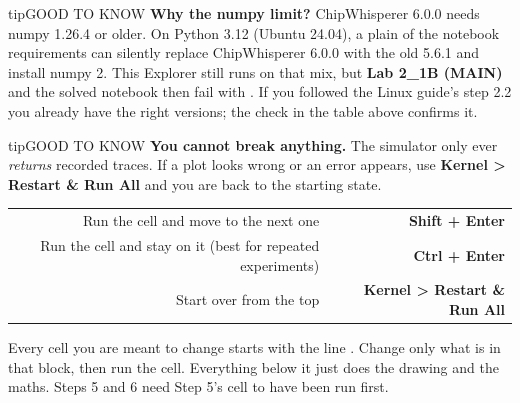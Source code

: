 \documentclass[11pt,letterpaper]{article}
\begin{document}
\begin{guidecallout}{tip}{GOOD TO KNOW}
\textbf{Why the numpy limit?} ChipWhisperer 6.0.0 needs numpy 1.26.4 or older. On Python 3.12 (Ubuntu 24.04), a plain
 of the notebook requirements can silently replace ChipWhisperer 6.0.0 with the old 5.6.1 and
install numpy 2. This Explorer still runs on that mix, but \textbf{Lab 2\_1B (MAIN)} and the solved notebook then fail
with .
If you followed the Linux guide's step 2.2 you already have the right versions; the check in the table above confirms
it.
\end{guidecallout}

\begin{guidecallout}{tip}{GOOD TO KNOW}
\textbf{You cannot break anything.} The simulator only ever \emph{returns} recorded traces. If a plot looks wrong or
an error appears, use \textbf{Kernel \textgreater{} Restart \& Run All} and you are back to the starting state.
\end{guidecallout}


{\small{}
\begin{longtable}{|R{0.6667}|R{0.3333}|}
\hline
{} &  \\ \hline
\endhead
Run the cell and move to the next one & \textbf{Shift + Enter} \\ \hline
Run the cell and stay on it (best for repeated experiments) & \textbf{Ctrl + Enter} \\ \hline
Start over from the top & \textbf{Kernel \textgreater{} Restart \& Run All} \\ \hline
\end{longtable}}

\vspace{4pt}

Every cell you are meant to change starts with the line \textbf{}. Change only what is in that
block, then run the cell. Everything below it just does the drawing and the maths. Steps 5 and 6 need Step 5's cell to
have been run first.

\Needspace{302pt}


\end{document}
